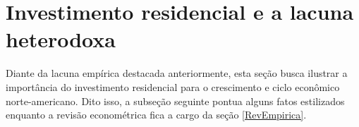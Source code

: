 \section{Investimento residencial e a lacuna heterodoxa}
\label{Secao_Residencial}

Diante da lacuna empírica destacada anteriormente, esta seção busca ilustrar a importância do investimento residencial para o crescimento e ciclo econômico norte-americano. 
Dito isso, a subseção seguinte pontua alguns fatos estilizados enquanto a revisão econométrica fica a cargo da seção \ref{RevEmpirica}.








